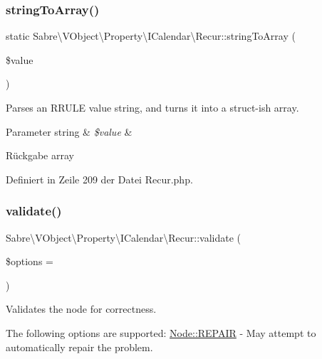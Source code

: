 \subsubsection{\texorpdfstring{string\+To\+Array()}{stringToArray()}}
{\footnotesize\ttfamily static Sabre\textbackslash{}\+V\+Object\textbackslash{}\+Property\textbackslash{}\+I\+Calendar\textbackslash{}\+Recur\+::string\+To\+Array (\begin{DoxyParamCaption}\item[{}]{\$value }\end{DoxyParamCaption})\hspace{0.3cm}{\ttfamily [static]}}

Parses an R\+R\+U\+LE value string, and turns it into a struct-\/ish array.


\begin{DoxyParams}[1]{Parameter}
string & {\em \$value} & \\
\hline
\end{DoxyParams}
\begin{DoxyReturn}{Rückgabe}
array 
\end{DoxyReturn}


Definiert in Zeile 209 der Datei Recur.\+php.

\mbox{\label{class_sabre_1_1_v_object_1_1_property_1_1_i_calendar_1_1_recur_a1377db71a3630a3854557613af241c9a}} 
\subsubsection{\texorpdfstring{validate()}{validate()}}
{\footnotesize\ttfamily Sabre\textbackslash{}\+V\+Object\textbackslash{}\+Property\textbackslash{}\+I\+Calendar\textbackslash{}\+Recur\+::validate (\begin{DoxyParamCaption}\item[{}]{\$options = {} }\end{DoxyParamCaption})}

Validates the node for correctness.

The following options are supported\+: \mbox{\hyperlink{class_sabre_1_1_v_object_1_1_node_ac97a7fb85c1f871523336cd1ec6b29a9}{Node\+::\+R\+E\+P\+A\+IR}} -\/ May attempt to automatically repair the problem.

